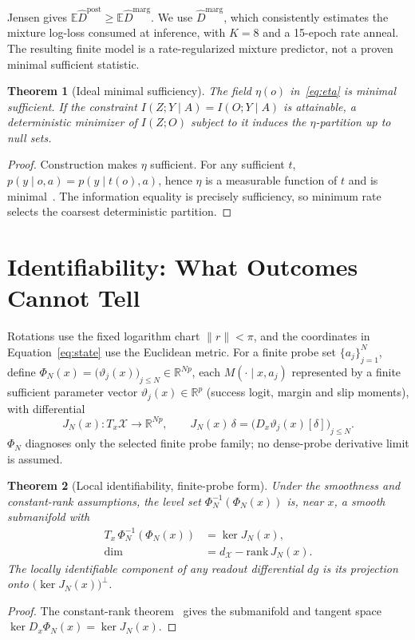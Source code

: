 \documentclass[letterpaper, 10pt, conference]{ieeeconf}
\newtheorem{theorem}{Theorem}
\newcommand{\E}{\mathbb{E}}
\newcommand{\R}{\mathbb{R}}
\newcommand{\dX}{d_{\mathcal{X}}}
\begin{document}
Jensen gives $\E\hat D^{\mathrm{post}}\ge\E\hat D^{\mathrm{marg}}$. We use
$\hat D^{\mathrm{marg}}$, which consistently estimates the mixture log-loss
consumed at inference, with $K=8$ and a 15-epoch rate anneal. The resulting
finite model is a rate-regularized mixture predictor, not a proven minimal
sufficient statistic.

\begin{theorem}[Ideal minimal sufficiency]
\label{thm:ib}
The field $\eta(o)$ in~\eqref{eq:eta} is minimal sufficient. If the constraint
$I(Z;Y\mid A)=I(O;Y\mid A)$ is attainable, a deterministic minimizer of
$I(Z;O)$ subject to it induces the $\eta$-partition up to null sets.
\end{theorem}
\begin{proof}
Construction makes $\eta$ sufficient. For any sufficient $t$,
$p(y\mid o,a)=p(y\mid t(o),a)$, hence $\eta$ is a measurable function of $t$
and is minimal~\cite{lehmann1998}. The information equality is precisely
sufficiency, so minimum rate selects the coarsest deterministic partition.
\end{proof}

\section{Identifiability: What Outcomes Cannot Tell}
\label{sec:identifiability}

Rotations use the fixed logarithm chart $\|r\|<\pi$, and the coordinates in
Equation~\eqref{eq:state} use the Euclidean metric. For a finite probe set
${\{a_j\}}_{j=1}^{N}$, define
$\Phi_N(x)={\bigl(\vartheta_j(x)\bigr)}_{j\le N}\in\R^{Np}$, each $M(\cdot\mid x,a_j)$
represented by a finite sufficient parameter vector $\vartheta_j(x)\in\R^p$
(success logit, margin and slip moments), with differential
\begin{equation}
J_N(x):T_x\mathcal{X}\to\R^{Np},\qquad
J_N(x)\,\delta={\bigl(D_x\vartheta_j(x)[\delta]\bigr)}_{j\le N}.
\label{eq:jacobian}
\end{equation}
$\Phi_N$ diagnoses only the selected finite probe family; no dense-probe
derivative limit is assumed.

\begin{theorem}[Local identifiability, finite-probe form]
\label{thm:identifiability}
Under the smoothness and constant-rank assumptions, the level set
$\Phi_N^{-1}(\Phi_N(x))$ is, near $x$, a
smooth submanifold with
\begin{equation}
\begin{aligned}
T_x\,\Phi_N^{-1}(\Phi_N(x))&=\ker J_N(x),\\
\dim&=\dX-\mathrm{rank}\,J_N(x).
\end{aligned}
\label{eq:kernel}
\end{equation}
The locally identifiable component of any readout differential $dg$ is its
projection onto ${\bigl(\ker J_N(x)\bigr)}^{\perp}$.
\end{theorem}
\begin{proof}
The constant-rank theorem~\cite{lee2012} gives the submanifold and tangent
space $\ker D_x\Phi_N(x)=\ker J_N(x)$.
\end{proof}
\end{document}
